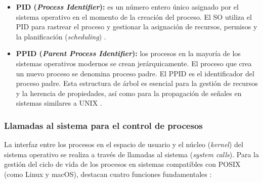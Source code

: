 \begin{itemize}[leftmargin=*]
    \item \textbf{PID (\textit{Process Identifier}):} es un número entero único asignado por el sistema operativo en el momento de la creación del proceso. El SO utiliza el PID para rastrear el proceso y gestionar la asignación de recursos, permisos y la planificación (\textit{scheduling}) \cite{kerrisk:linux-programming-interface:2010}.
    \item \textbf{PPID (\textit{Parent Process Identifier}):} los procesos en la mayoría de los sistemas operativos modernos se crean jerárquicamente. El proceso que crea un nuevo proceso se denomina proceso padre. El PPID es el identificador del proceso padre. Esta estructura de árbol es esencial para la gestión de recursos y la herencia de propiedades, así como para la propagación de señales en sistemas similares a UNIX \cite{tanenbaum:modern-os:2014}.
\end{itemize}

\subsubsection{Llamadas al sistema para el control de procesos}

La interfaz entre los procesos en el espacio de usuario y el núcleo (\textit{kernel}) del sistema operativo se realiza a través de llamadas al sistema (\textit{system calls}). Para la gestión del ciclo de vida de los procesos en sistemas compatibles con POSIX (como Linux y macOS), destacan cuatro funciones fundamentales \cite{kerrisk:linux-programming-interface:2010}:

